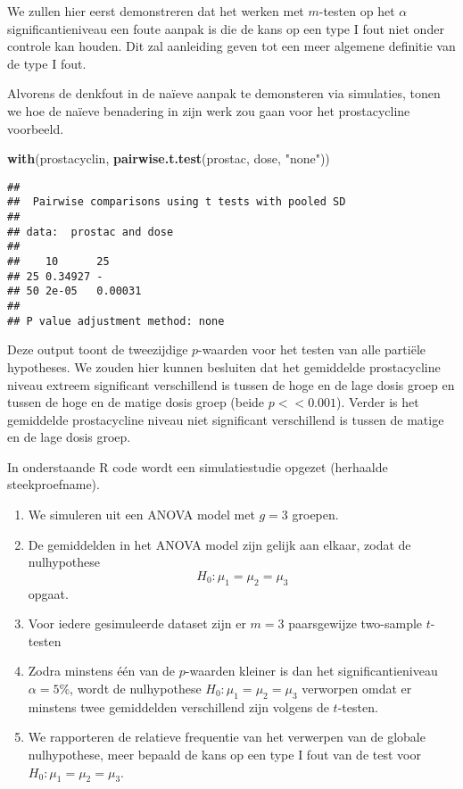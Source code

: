 \documentclass[12pt,dutch,coursenotes]{book}
\newenvironment{Shaded}{\begin{snugshade}}{\end{snugshade}}
\newcommand{\KeywordTok}[1]{\textcolor[rgb]{0.13,0.29,0.53}{\textbf{#1}}}
\newcommand{\StringTok}[1]{\textcolor[rgb]{0.31,0.60,0.02}{#1}}
\newcommand{\NormalTok}[1]{#1}
\providecommand{\tightlist}{%
  \setlength{\itemsep}{0pt}\setlength{\parskip}{0pt}}
\theoremstyle{definition}
\theoremstyle{definition}
\theoremstyle{definition}
\theoremstyle{remark}
\begin{document}
We zullen hier eerst demonstreren dat het werken met \(m\)-testen op het
\(\alpha\) significantieniveau een foute aanpak is die de kans op een
type I fout niet onder controle kan houden. Dit zal aanleiding geven tot
een meer algemene definitie van de type I fout.

Alvorens de denkfout in de naïeve aanpak te demonsteren via simulaties,
tonen we hoe de naïeve benadering in zijn werk zou gaan voor het
prostacycline voorbeeld.

\begin{Shaded}
\begin{Highlighting}[]
\KeywordTok{with}\NormalTok{(prostacyclin, }\KeywordTok{pairwise.t.test}\NormalTok{(prostac, dose, }\StringTok{"none"}\NormalTok{))}
\end{Highlighting}
\end{Shaded}

\begin{verbatim}
## 
##  Pairwise comparisons using t tests with pooled SD 
## 
## data:  prostac and dose 
## 
##    10      25     
## 25 0.34927 -      
## 50 2e-05   0.00031
## 
## P value adjustment method: none
\end{verbatim}

Deze output toont de tweezijdige \(p\)-waarden voor het testen van alle
partiële hypotheses. We zouden hier kunnen besluiten dat het gemiddelde
prostacycline niveau extreem significant verschillend is tussen de hoge
en de lage dosis groep en tussen de hoge en de matige dosis groep (beide
\(p<<0.001\)). Verder is het gemiddelde prostacycline niveau niet
significant verschillend is tussen de matige en de lage dosis groep.

In onderstaande R code wordt een simulatiestudie opgezet (herhaalde
steekproefname).

\begin{enumerate}
\def\labelenumi{\arabic{enumi}.}
\tightlist
\item
  We simuleren uit een ANOVA model met \(g=3\) groepen.
\item
  De gemiddelden in het ANOVA model zijn gelijk aan elkaar, zodat de
  nulhypothese \[H_0: \mu_1=\mu_2=\mu_3\] opgaat.
\item
  Voor iedere gesimuleerde dataset zijn er \(m=3\) paarsgewijze
  two-sample \(t\)-testen
\item
  Zodra minstens één van de \(p\)-waarden kleiner is dan het
  significantieniveau \(\alpha=5\%\), wordt de nulhypothese
  \(H_0: \mu_1=\mu_2=\mu_3\) verworpen omdat er minstens twee
  gemiddelden verschillend zijn volgens de \(t\)-testen.
\item
  We rapporteren de relatieve frequentie van het verwerpen van de
  globale nulhypothese, meer bepaald de kans op een type I fout van de
  test voor \(H_0: \mu_1=\mu_2=\mu_3\).
\end{enumerate}
\end{document}
